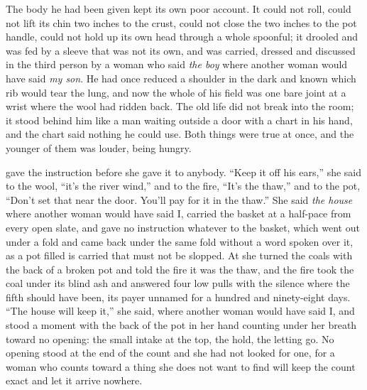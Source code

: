 The body he had been given kept its own poor account. It could not roll, could not lift its chin two inches to the crust, could not close the two inches to the pot handle, could not hold up its own head through a whole spoonful; it drooled and was fed by a sleeve that was not its own, and was carried, dressed and discussed in the third person by a woman who said \emph{the boy} where another woman would have said \emph{my son}. He had once reduced a shoulder in the dark and known which rib would tear the lung, and now the whole of his field was one bare joint at a wrist where the wool had ridden back. The old life did not break into the room; it stood behind him like a man waiting outside a door with a chart in his hand, and the chart said nothing he could use. Both things were true at once, and the younger of them was louder, being hungry.

\scenebreak

 gave the instruction before she gave it to anybody. “Keep it off his ears,” she said to the wool, “it's the river wind,” and to the fire, “It's the thaw,” and to the pot, “Don't set that near the door. You'll pay for it in the thaw.” She said \emph{the house} where another woman would have said I, carried the basket at a half-pace from every open slate, and gave no instruction whatever to the basket, which went out under a fold and came back under the same fold without a word spoken over it, as a pot filled is carried that must not be slopped. At  she turned the coals with the back of a broken pot and told the fire it was the thaw, and the fire took the coal under its blind ash and answered four low pulls with the silence where the fifth should have been, its payer unnamed for a hundred and ninety-eight days. “The house will keep it,” she said, where another woman would have said I, and stood a moment with the back of the pot in her hand counting under her breath toward no opening: the small intake at the top, the hold, the letting go. No opening stood at the end of the count and she had not looked for one, for a woman who counts toward a thing she does not want to find will keep the count exact and let it arrive nowhere.

